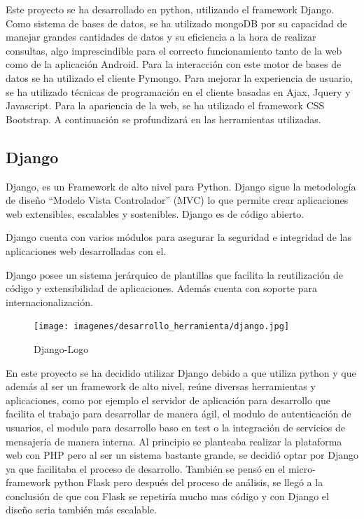 \documentclass[a4paper,11pt]{book}
\begin{document}
Este proyecto se ha desarrollado en python, utilizando el framework Django. Como sistema de bases de datos, se ha utilizado mongoDB por su capacidad de manejar grandes cantidades de datos y su eficiencia a la hora de realizar consultas, algo imprescindible para el correcto funcionamiento tanto de la web como de la aplicación Android. Para la interacción con este motor de bases de datos se ha utilizado el cliente Pymongo. Para mejorar la experiencia de usuario, se ha utilizado técnicas de programación en el cliente basadas en Ajax, Jquery y Javascript. Para la apariencia de la web, se ha utilizado el framework CSS Bootstrap. A continuación se profundizará en las herramientas utilizadas. 

 



\subsection{Django}
Django\cite{dj}, es un Framework de alto nivel para Python. Django sigue la metodología de diseño “Modelo Vista Controlador” (MVC) lo que permite crear aplicaciones web extensibles, escalables y sostenibles. Django es de código abierto. 

Django cuenta con varios módulos para asegurar la seguridad e integridad de las aplicaciones web desarrolladas con el. 

Django posee un sistema jerárquico de plantillas que facilita la reutilización de código y extensibilidad de aplicaciones. Además cuenta con soporte para internacionalización.

\begin{figure}[H] 
\centering 
\texttt{[image: imagenes/desarrollo\_herramienta/django.jpg]}
\caption{ Django-Logo\cite{djL}  }  
\end{figure} 

En este proyecto se ha decidido utilizar Django debido a que utiliza python y que además al ser un framework de alto nivel, reúne diversas herramientas y aplicaciones, como por ejemplo el servidor de aplicación para desarrollo que facilita el trabajo para desarrollar de manera ágil, el modulo de autenticación de usuarios, el modulo para desarrollo baso en test o la integración de servicios de mensajería de manera interna. Al principio se planteaba realizar la plataforma web con PHP pero al ser un sistema bastante grande, se decidió optar por Django ya que facilitaba el proceso de desarrollo. También se pensó en el micro-framework python Flask pero después del proceso de análisis, se llegó a la conclusión de que con Flask\cite{fl} se repetiría mucho mas código y con Django el diseño seria también más escalable.
\end{document}
